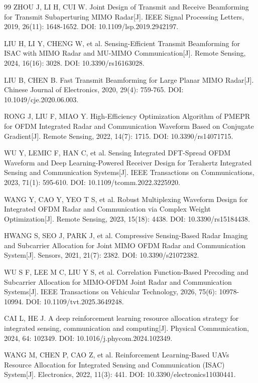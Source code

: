 \begin{thebibliography}{99}
 ZHOU J, LI H, CUI W. Joint Design of Transmit and Receive Beamforming for Transmit Subaperturing MIMO Radar[J]. IEEE Signal Processing Letters, 2019, 26(11): 1648-1652. DOI: 10.1109/lsp.2019.2942197.

 LIU H, LI Y, CHENG W, et al. Sensing-Efficient Transmit Beamforming for ISAC with MIMO Radar and MU-MIMO Communication[J]. Remote Sensing, 2024, 16(16): 3028. DOI: 10.3390/rs16163028.

 LIU B, CHEN B. Fast Transmit Beamforming for Large Planar MIMO Radar[J]. Chinese Journal of Electronics, 2020, 29(4): 759-765. DOI: 10.1049/cje.2020.06.003.

 RONG J, LIU F, MIAO Y. High-Efficiency Optimization Algorithm of PMEPR for OFDM Integrated Radar and Communication Waveform Based on Conjugate Gradient[J]. Remote Sensing, 2022, 14(7): 1715. DOI: 10.3390/rs14071715.

 WU Y, LEMIC F, HAN C, et al. Sensing Integrated DFT-Spread OFDM Waveform and Deep Learning-Powered Receiver Design for Terahertz Integrated Sensing and Communication Systems[J]. IEEE Transactions on Communications, 2023, 71(1): 595-610. DOI: 10.1109/tcomm.2022.3225920.

 WANG Y, CAO Y, YEO T S, et al. Robust Multiplexing Waveform Design for Integrated OFDM Radar and Communication via Complex Weight Optimization[J]. Remote Sensing, 2023, 15(18): 4438. DOI: 10.3390/rs15184438.

 HWANG S, SEO J, PARK J, et al. Compressive Sensing-Based Radar Imaging and Subcarrier Allocation for Joint MIMO OFDM Radar and Communication System[J]. Sensors, 2021, 21(7): 2382. DOI: 10.3390/s21072382.

 WU S F, LEE M C, LIU Y S, et al. Correlation Function-Based Precoding and Subcarrier Allocation for MIMO-OFDM Joint Radar and Communication Systems[J]. IEEE Transactions on Vehicular Technology, 2026, 75(6): 10978-10994. DOI: 10.1109/tvt.2025.3649248.

 CAI L, HE J. A deep reinforcement learning resource allocation strategy for integrated sensing, communication and computing[J]. Physical Communication, 2024, 64: 102349. DOI: 10.1016/j.phycom.2024.102349.

 WANG M, CHEN P, CAO Z, et al. Reinforcement Learning-Based UAVs Resource Allocation for Integrated Sensing and Communication (ISAC) System[J]. Electronics, 2022, 11(3): 441. DOI: 10.3390/electronics11030441.


\end{thebibliography}
